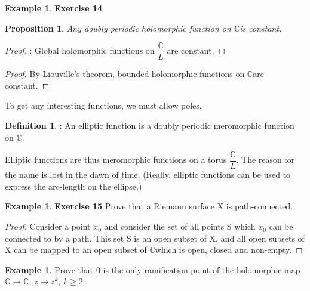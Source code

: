 \documentclass[12pt, oneside, a4paper]{article}
\newtheorem{prop}[thm]{Proposition}
\theoremstyle{definition}
\newtheorem{dfn}[thm]{Definition}
\newtheorem{ex}[thm]{Example}
\def\Cbb{\ensuremath{\mathbb{C}}}
\begin{document}
\begin{ex}\textbf{Exercise 14}

 \begin{prop}Any doubly periodic holomorphic function on \Cbb is constant.\end{prop}
\begin{proof}: Global holomorphic functions on $\dfrac{\Cbb}{L}$ are constant.\end{proof}
\begin{proof} By Liouville's theorem, bounded holomorphic functions on \Cbb  are constant. \end{proof}
To get any interesting functions, we must allow poles.
\begin{dfn}: An elliptic function is a doubly periodic meromorphic function on \Cbb.\end{dfn}
Elliptic functions are thus meromorphic functions on a torus $\dfrac{\Cbb}{L}$. The reason for the name is
lost in the dawn of time. (Really, elliptic functions can be used to express the arc-length on the
ellipse.)
\end{ex}
\begin{ex}\textbf{Exercise 15}
Prove that a Riemann surface X is path-connected.
\begin{proof}
 Consider a point $x_{0}$ and consider the set of all points S which $x_{0}$ can be connected to by a path.
This set S is an open subset of X, and all open subsets of X can be mapped to an open subset of \Cbb which is
open, closed and non-empty.
\end{proof}

 
\end{ex}
\begin{ex}
 Prove that 0 is the only ramification point of the holomorphic map 
$\Cbb \to \Cbb$, $z \mapsto z^{k}$, $k \geq 2$
\end{ex}

\newpage
\end{document}
